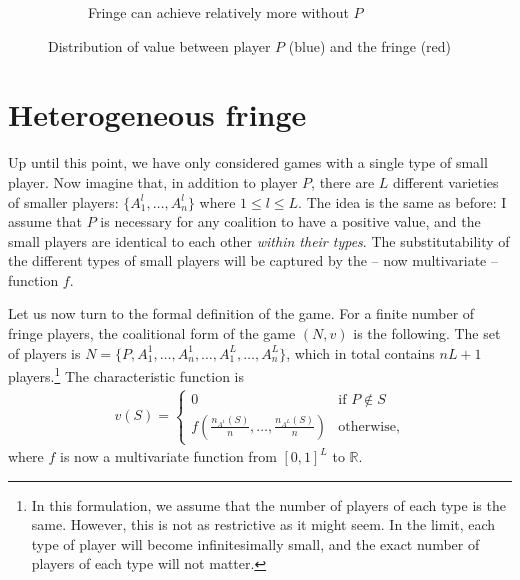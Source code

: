 \documentclass[a4paper]{article}
\begin{document}
\begin{figure}
\begin{subfigure}[b]{0.45\textwidth}
        \caption{Fringe can achieve relatively more without $P$}
    \end{subfigure}
    \caption{Distribution of value between player $P$ (blue) and the fringe (red)}
    \label{fig:non_indispensable}
\end{figure}


\section{Heterogeneous fringe}
\label{sec:many_sided}

Up until this point, we have only considered games with a single type of small player.
Now imagine that, in addition to player $P$, there are $L$ different varieties of smaller players: $\{A^l_1, \dots, A^l_n\}$ where $1 \leq l \leq L$.
The idea is the same as before: I assume that $P$ is necessary for any coalition to have a positive value, and the small players are identical to each other \emph{within their types}.
The substitutability of the different types of small players will be captured by the -- now multivariate -- function $f$.

Let us now turn to the formal definition of the game.
For a finite number of fringe players, the coalitional form of the game $(N, v)$ is the following.
The set of players is $N = \{P, A^1_1, \dots, A^1_n, \dots, A^L_1, \dots, A^L_n\}$, which in total contains $nL + 1$ players.\footnote{
    In this formulation, we assume that the number of players of each type is the same.
    However, this is not as restrictive as it might seem.
    In the limit, each type of player will become infinitesimally small, and the exact number of players of each type will not matter.
}
The characteristic function is
\begin{align*}
    v(S) = \begin{cases}
        0                                                & \text{if } P \notin S \\
        f\left(\frac{n_{A^1}(S)}{n}, \dots, \frac{n_{A^L}(S)}{n}\right) & \text{otherwise},
    \end{cases}
\end{align*}
where $f$ is now a multivariate function from $[0, 1]^L$ to $\mathbb{R}$.
\end{document}
